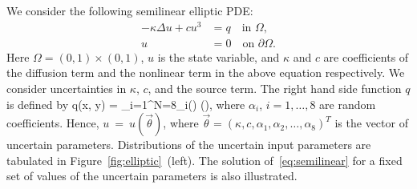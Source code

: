 We consider the following semilinear elliptic PDE: 
\begin{equation}\label{eq:semilinear}
\begin{aligned}
-\kappa \Delta u + c u^3 &= q \quad \text{in } \Omega,\\
 u &= 0 \quad \text{on } \partial \Omega.
\end{aligned}
\end{equation}
Here $\Omega = (0, 1)\times(0,1)$, 
$u$ is the state variable, and $\kappa$ and $c$ are coefficients of the diffusion term
and the nonlinear term in the above equation respectively. 
We consider uncertainties in $\kappa$, $c$, and the source term. 
The right hand side function $q$ is defined by 
\be
q(x, y) = 
\sum\limits_{i=1}^{N=8}\alpha_i\sin\left(\right)
                               \cos\left(\right),
\label{eq:source}
\ee
where $\alpha_i$, $i = 1, \ldots, 8$ are random coefficients.
%
Hence, $u~=~u(\vec{\theta})$, where $\vec{\theta} = 
(\kappa,c,\alpha_1,\alpha_2,\ldots,\alpha_{8})^T$ is the vector
of uncertain parameters. Distributions of the uncertain
input parameters are tabulated in Figure~\ref{fig:elliptic}~(left).
The solution of~\eqref{eq:semilinear} for
a fixed set of values of the uncertain parameters is also 
illustrated.

